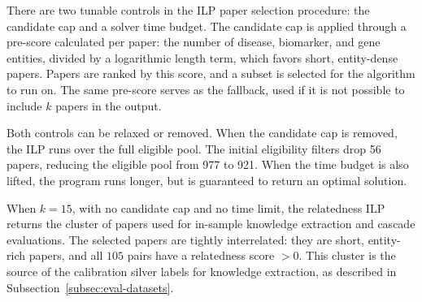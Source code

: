 There are two tunable controls in the ILP paper selection procedure: the candidate cap and a solver time budget. The candidate cap is applied through a pre-score calculated per paper: the number of disease, biomarker, and gene entities, divided by a logarithmic length term, which favors short, entity-dense papers. Papers are ranked by this score, and a subset is selected for the algorithm to run on. The same pre-score serves as the fallback, used if it is not possible to include $k$ papers in the output. 

Both controls can be relaxed or removed. When the candidate cap is removed, the ILP runs over the full eligible pool. The initial eligibility filters drop 56 papers, reducing the eligible pool from 977 to 921. When the time budget is also lifted, the program runs longer, but is guaranteed to return an optimal solution.

When $k=15$, with no candidate cap and no time limit, the relatedness ILP returns the cluster of papers used for in-sample knowledge extraction and cascade evaluations. The selected papers are tightly interrelated: they are short, entity-rich papers, and all $105$ pairs have a relatedness score $>0$. This cluster is the source of the calibration silver labels for knowledge extraction, as described in Subsection~\ref{subsec:eval-datasets}.